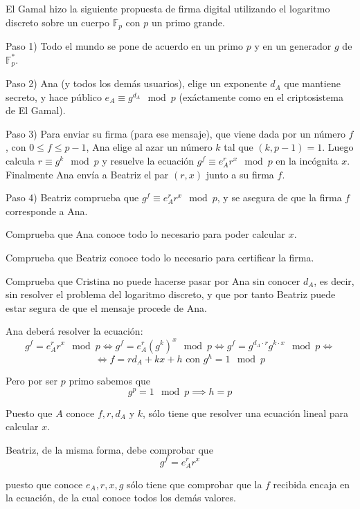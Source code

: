 \begin{problem}[3]
 El Gamal hizo la siguiente propuesta de firma digital utilizando
el logaritmo discreto sobre un cuerpo $\mathbb{F}_p$ con $p$ un primo
grande.

Paso 1) Todo el mundo se pone de acuerdo en un primo $p$ y en un
generador $g$ de $\mathbb{F}_p^*$.

Paso 2) Ana (y todos los demás usuarios), elige un exponente $d_A$
que mantiene secreto, y hace público $e_A\equiv g^{d_A}\mod p$
(exáctamente como en el criptosistema de El Gamal).

Paso 3) Para enviar su firma (para ese mensaje), que viene dada
por un número $f$, con $0\le f\le p-1$, Ana elige al azar un
número $k$ tal que $(k,p-1)=1$. Luego calcula $r\equiv g^k \mod p$
y resuelve la ecuación $g^f\equiv e_A^r r^x \mod p$ en la
incógnita $x$. Finalmente Ana envía a Beatriz el par $(r,x)$ junto
a su firma $f$.

Paso 4)  Beatriz comprueba que $g^f\equiv e_A^r r^x \mod p$, y se
asegura de que la firma $f$ corresponde a Ana.

\ppart Comprueba que Ana conoce todo lo necesario para
poder calcular $x$.

\ppart Comprueba que Beatriz conoce todo lo necesario para certificar
la firma.

\ppart Comprueba que Cristina no puede hacerse pasar por Ana sin
conocer $d_A$, es decir, sin resolver el problema del logaritmo
discreto, y que por tanto Beatriz puede estar segura de que el
mensaje procede de Ana.

\solution


\spart

Ana deberá resolver la ecuación:
\[g^f=e_A^rr^x \mod p\iff g^f = e_A^r(g^k)^x \mod p\iff g^f=g^{d_A\cdot r}g^{k\cdot x} \mod p\iff\]
\[\iff f = rd_A+kx + h \text{ con } g^h=1 \mod p\]


Pero por ser $p$ primo sabemos que 
\[g^p =1 \mod p \implies h = p\]

Puesto que $A$ conoce $f,r,d_A$ y $k$, sólo tiene que resolver una ecuación lineal para calcular $x$.

\spart

Beatriz, de la misma forma, debe comprobar que 
\[g^f=e_A^rr^x\]

puesto que conoce $e_A,r,x,g$ sólo tiene que comprobar que la $f$ recibida encaja en la ecuación, de la cual conoce todos los demás valores.


\end{problem}
